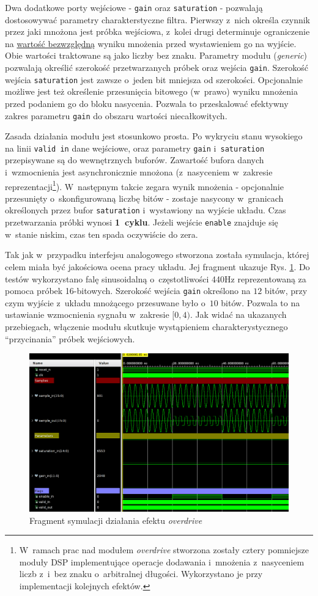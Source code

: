 Dwa dodatkowe porty wejściowe - \verb|gain| oraz \verb|saturation| - pozwalają dostosowywać parametry charakterstyczne filtra. Pierwszy z~nich określa czynnik przez jaki mnożona jest próbka wejściowa, z~kolei drugi determinuje ograniczenie na \underline{wartość bezwzględną} wyniku mnożenia przed wystawieniem go na wyjście. Obie wartości traktowane są jako liczby bez znaku. Parametry modułu (\textit{generic}) pozwalają określić szerokość przetwarzanych próbek oraz wejścia \verb|gain|. Szerokość wejścia \verb|saturation| jest zawsze o~jeden bit mniejsza od szerokości. Opcjonalnie możliwe jest też określenie przesunięcia bitowego (w~prawo) wyniku mnożenia przed podaniem go do bloku nasycenia. Pozwala to przeskalować efektywny zakres parametru \verb|gain| do obszaru wartości niecałkowitych.

Zasada działania modułu jest stosunkowo prosta. Po wykryciu stanu wysokiego na linii \verb|valid in| dane wejściowe, oraz parametry \verb|gain| i~\verb|saturation| przepisywane są do wewnętrznych buforów. Zawartość bufora danych i~wzmocnienia jest asynchronicznie mnożona (z~nasyceniem w~zakresie reprezentacji\footnote{W~ramach prac nad modułem \textit{overdrive} stworzona zostały cztery pomniejsze moduły DSP implementujące operacje dodawania i~mnożenia z~nasyceniem liczb z~i~bez znaku o~arbitralnej długości. Wykorzystano je przy implementacji kolejnych efektów.}). W~następnym takcie zegara wynik mnożenia - opcjonalnie przesunięty o~skonfigurowaną liczbę bitów - zostaje nasycony w~granicach określonych przez bufor \verb|saturation| i~wystawiony na wyjście układu. Czas przetwarzania próbki wynosi \textbf{1~cyklu}. Jeżeli wejście \verb|enable| znajduje się w~stanie niskim, czas ten spada oczywiście do zera. 

Tak jak w~przypadku interfejsu analogowego stworzona została symulacja, której celem miała być jakościowa ocena pracy układu. Jej fragment ukazuje Rys. \ref{sim-overdrive}. Do testów wykorzystano falę sinusoidalną o~częstotliwości 440Hz reprezentowaną za pomoca próbek 16-bitowych. Szerokość wejścia \verb|gain| określono na $12$ bitów, przy czym wyjście z~układu mnożącego przesuwane było o~$10$ bitów. Pozwala to na ustawianie wzmocnienia sygnału w~zakresie $[0,4)$. Jak widać na ukazanych przebiegach, włączenie modułu skutkuje wystąpieniem charakterystycznego ``przycinania'' próbek wejściowych.

\vspace{0.5cm}
\begin{figure}[ht]
    \centering
    \includegraphics[width=\textwidth]{img/sim/overdrive_sim.png}
    \captionsetup{format=plain,justification=centering}
    \caption{Fragment symulacji działania efektu \textit{overdrive}}
    \label{sim-overdrive}
\end{figure}
\vspace{0.5cm}